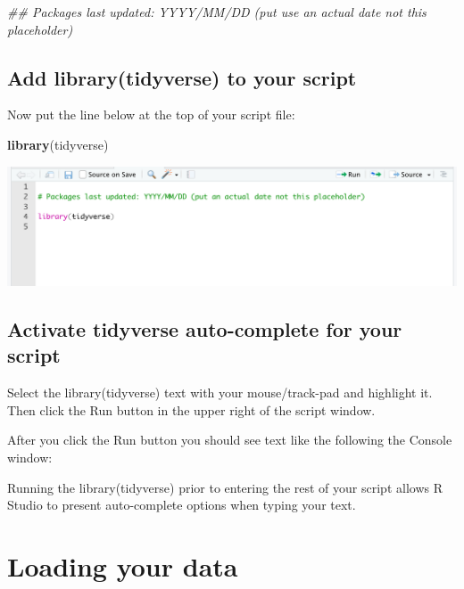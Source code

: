 \documentclass[
]{krantz}
\makeatletter
\newenvironment{Shaded}{\begin{snugshade}}{\end{snugshade}}
\newcommand{\CommentTok}[1]{\textcolor[rgb]{0.37,0.37,0.37}{\textit{#1}}}
\newcommand{\KeywordTok}[1]{\textcolor[rgb]{0.27,0.27,0.27}{\textbf{#1}}}
\newcommand{\NormalTok}[1]{#1}
\newenvironment{kframe}{%
\medskip{}
\setlength{\fboxsep}{.8em}
 \def\at@end@of@kframe{}%
 \ifinner\ifhmode%
  \def\at@end@of@kframe{\end{minipage}}%
  \begin{minipage}{\columnwidth}%
 \fi\fi%
 \def\FrameCommand##1{\hskip\@totalleftmargin \hskip-\fboxsep
 \colorbox{shadecolor}{##1}\hskip-\fboxsep
     \hskip-\linewidth \hskip-\@totalleftmargin \hskip\columnwidth}%
 \MakeFramed {\advance\hsize-\width
   \@totalleftmargin\z@ \linewidth\hsize
   \@setminipage}}%
 {\par\unskip\endMakeFramed%
 \at@end@of@kframe}
\renewenvironment{Shaded}{\begin{kframe}}{\end{kframe}}
\makeatother
\begin{document}
\begin{Shaded}
\begin{Highlighting}[]
\CommentTok{## Packages last updated: YYYY/MM/DD (put use an actual date not this placeholder)}
\end{Highlighting}
\end{Shaded}

\hypertarget{add-librarytidyverse-to-your-script}{%
\subsection{Add library(tidyverse) to your script}\label{add-librarytidyverse-to-your-script}}

Now put the line below at the top of your script file:

\begin{Shaded}
\begin{Highlighting}[]
\KeywordTok{library}\NormalTok{(tidyverse)}
\end{Highlighting}
\end{Shaded}

\includegraphics[width=0.5\linewidth,height=0.5\textheight]{first_time/images/script_tidyverse}

\hypertarget{activate-tidyverse-auto-complete-for-your-script}{%
\subsection{Activate tidyverse auto-complete for your script}\label{activate-tidyverse-auto-complete-for-your-script}}

Select the library(tidyverse) text with your mouse/track-pad and highlight it. Then click the Run button in the upper right of the script window.

After you click the Run button you should see text like the following the Console window:

Running the library(tidyverse) prior to entering the rest of your script allows R Studio to present auto-complete options when typing your text.

\hypertarget{loading-your-data}{%
\section{Loading your data}\label{loading-your-data}}
\end{document}

